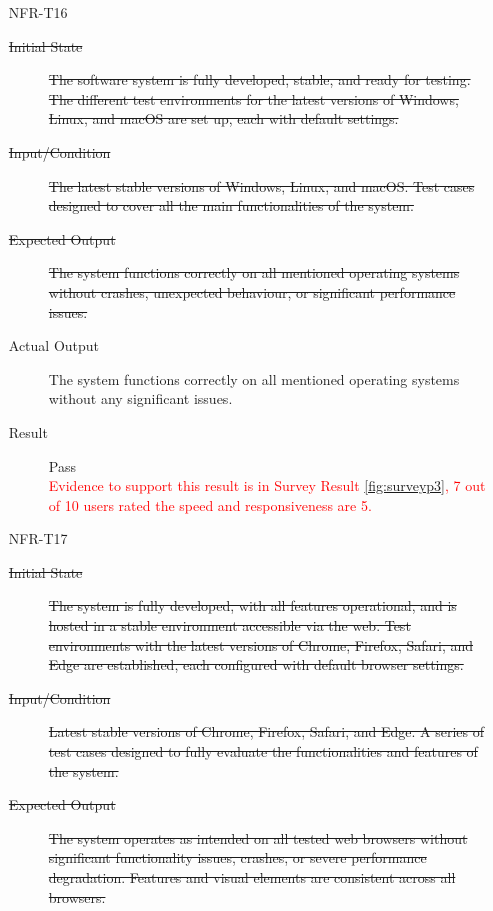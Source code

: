 \documentclass[12pt, titlepage]{article}
\newcommand{\rt}[1]{\textcolor{red}{#1}}
\begin{document}
  \begin{enumerate}
    \item[NFR-T16] \label{NFRT16}
      \begin{description}
      \item[\sout{Initial State}] \sout{The software system is fully developed,
          stable, and ready for testing. The different test environments for the
          latest versions of Windows, Linux, and macOS are set up, each with
          default settings.}
      \item[\sout{Input/Condition}] \sout{The latest stable versions of Windows,
          Linux, and macOS. Test cases designed to cover all the main
          functionalities of the system.}
      \item[\sout{Expected Output}] \sout{The system functions correctly on all
          mentioned operating systems without crashes, unexpected behaviour, or
          significant performance issues.}
      \item[Actual Output] The system functions correctly on all mentioned operating
        systems without any significant issues.
      \item[Result] Pass \\
        \rt{Evidence to support this result is in Survey Result
          \ref{fig:surveyp3}, 7 out of 10 users rated the speed and
          responsiveness are 5.}
      \end{description}
    \item[NFR-T17] \label{NFRT17}
      \begin{description}
      \item[\sout{Initial State}] \sout{The system is fully developed, with all
          features operational, and is hosted in a stable environment accessible
          via the web. Test environments with the latest versions of Chrome,
          Firefox, Safari, and Edge are established, each configured with
          default browser settings.}
      \item[\sout{Input/Condition}] \sout{Latest stable versions of Chrome,
          Firefox, Safari, and Edge. A series of test cases designed to fully
          evaluate the functionalities and features of the system.}
      \item[\sout{Expected Output}] \sout{The system operates as intended on all
          tested web browsers without significant functionality issues, crashes,
          or severe performance degradation. Features and visual elements are
          consistent across all browsers.}

\end{description}
\end{enumerate}
\end{document}
